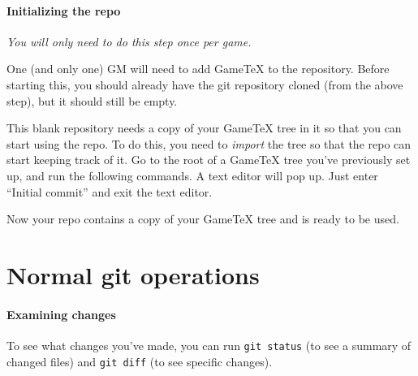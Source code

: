 \documentclass[green]{testgame}
\begin{document}
\paragraph*{Initializing the repo} \emph{You will only need to do this step once per game.}

One (and only one) GM will need to add GameTeX to the repository. Before starting this, you should already have the git repository cloned (from the above step), but it should still be empty.


This blank repository needs a copy of your GameTeX tree in it so that
you can start using the repo. To do this, you need to \emph{import} the
tree so that the repo can start keeping track of it. Go to the root of
a GameTeX tree you've previously set up, and run the following
commands. A text editor will pop up. Just enter ``Initial commit'' and
exit the text editor.


Now your repo contains a copy of your GameTeX tree and is ready to be
used.

\section{Normal git operations}

\paragraph*{Examining changes}

To see what changes you've made, you can run \texttt{git status} (to see a summary of changed files) and \texttt{git diff} (to see specific changes).
\end{document}

